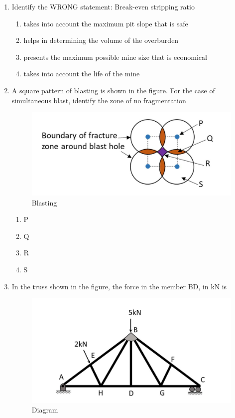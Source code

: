 \documentclass[journal,12pt,onecolumn]{IEEEtran}
\theoremstyle{remark}
\begin{document}
\begin{enumerate}
\hfill{}
\begin{table}[H]
  \centering
  \caption{Match The Following}
  
  \label{tab:Table1}
\end{table}
\begin{multicols}{2}
\begin{enumerate}
\item P-II, Q-IV, R-I, S-III 
\item P-III, Q-I, R-IV, S-II
\item P-IV, Q-III, R-I, S-II
\item P-II, Q-III, R-IV, S-I 
\end{enumerate}
\end{multicols}

\item Identify the WRONG statement:
Break-even stripping ratio 

\hfill{}
\begin{enumerate}
\item takes into account the maximum pit slope that is safe  
\item helps in determining the volume of the overburden  
\item presents the maximum possible mine size that is economical 
\item takes into account the life of the mine
\end{enumerate}

\item A square pattern of blasting is shown in the figure. For the case of simultaneous blast, identify the zone of no fragmentation
\begin{figure}[H]
\centering
\includegraphics[width=0.4\columnwidth]{figs/blasting.png}
\caption{Blasting}
\label{fig:blast}
\end{figure}
\hfill{}
\begin{multicols}{4}
\begin{enumerate}
\item P
\item Q
\item R
\item S
\end{enumerate}
\end{multicols}
\item In the truss shown in the figure, the force in the member BD, in kN is
\begin{figure}[H]
\centering
\includegraphics[width=0.4\columnwidth]{figs/truss1.png}
\caption{Diagram}
\label{fig:t}
\end{figure}


\end{enumerate}
\end{document}
